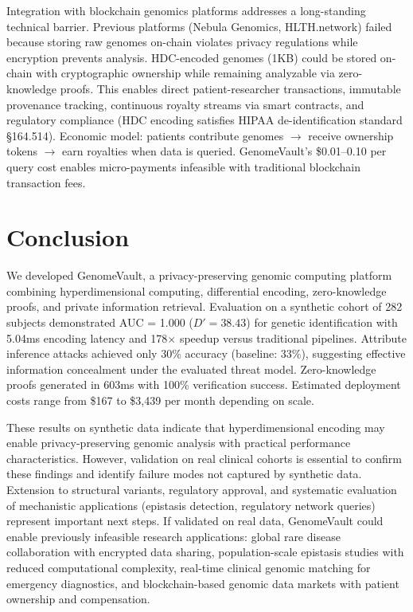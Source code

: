 \documentclass[11pt,letterpaper]{article}
\begin{document}
Integration with blockchain genomics platforms addresses a long-standing technical barrier. Previous platforms (Nebula Genomics, HLTH.network) failed because storing raw genomes on-chain violates privacy regulations while encryption prevents analysis. HDC-encoded genomes (1KB) could be stored on-chain with cryptographic ownership while remaining analyzable via zero-knowledge proofs. This enables direct patient-researcher transactions, immutable provenance tracking, continuous royalty streams via smart contracts, and regulatory compliance (HDC encoding satisfies HIPAA de-identification standard \S164.514). Economic model: patients contribute genomes $\rightarrow$ receive ownership tokens $\rightarrow$ earn royalties when data is queried. GenomeVault's \$0.01--0.10 per query cost enables micro-payments infeasible with traditional blockchain transaction fees.

\section{Conclusion}

We developed GenomeVault, a privacy-preserving genomic computing platform combining hyperdimensional computing, differential encoding, zero-knowledge proofs, and private information retrieval. Evaluation on a synthetic cohort of 282 subjects demonstrated AUC = 1.000 ($D' = 38.43$) for genetic identification with 5.04ms encoding latency and 178$\times$ speedup versus traditional pipelines. Attribute inference attacks achieved only 30\% accuracy (baseline: 33\%), suggesting effective information concealment under the evaluated threat model. Zero-knowledge proofs generated in 603ms with 100\% verification success. Estimated deployment costs range from \$167 to \$3,439 per month depending on scale.

These results on synthetic data indicate that hyperdimensional encoding may enable privacy-preserving genomic analysis with practical performance characteristics. However, validation on real clinical cohorts is essential to confirm these findings and identify failure modes not captured by synthetic data. Extension to structural variants, regulatory approval, and systematic evaluation of mechanistic applications (epistasis detection, regulatory network queries) represent important next steps. If validated on real data, GenomeVault could enable previously infeasible research applications: global rare disease collaboration with encrypted data sharing, population-scale epistasis studies with reduced computational complexity, real-time clinical genomic matching for emergency diagnostics, and blockchain-based genomic data markets with patient ownership and compensation.
\end{document}
